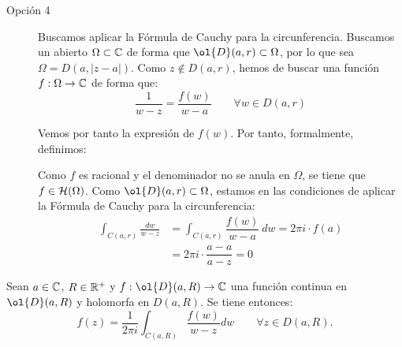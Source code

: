 \begin{ejercicio}
\begin{description}
        \item[Opción 4] Buscamos aplicar la Fórmula de Cauchy para la circunferencia. Buscamos un abierto $\Omega\subset \mathbb{C}$ de forma que $\ol{D}(a,r)\subset \Omega$, por lo que sea $\Omega=D(a,|z-a|)$. Como $z\notin D(a,r)$, hemos de buscar una función $f:\Omega\to \mathbb{C}$ de forma que:
        \begin{equation*}
            \dfrac{1}{w-z} = \dfrac{f(w)}{w-a}\qquad \forall w\in D(a,r)
        \end{equation*}

        Vemos por tanto la expresión de $f(w)$. Por tanto, formalmente, definimos:

        Como $f$ es racional y el denominador no se anula en $\Omega$, se tiene que $f\in \mathcal{H}(\Omega)$. Como $\ol{D}(a,r)\subset \Omega$, estamos en las condiciones de aplicar la Fórmula de Cauchy para la circunferencia:
        \begin{align*}
            \int_{C(a,r)} \frac{dw}{w-z} &= \int_{C(a,r)} \dfrac{f(w)}{w-a}\ dw
            = 2\pi i \cdot f(a)\\
            &= 2\pi i \cdot \dfrac{a-a}{a-z} = 0
        \end{align*}
    \end{description}
\end{ejercicio}

\begin{ejercicio}\label{ej:7.2}
    Sean $a \in \mathbb{C}$, $R \in \mathbb{R}^+$ y $f : \ol{D}(a,R) \to \bb{C}$ una función continua en $\ol{D}(a,R)$ y holomorfa en $D(a,R)$. Se tiene entonces:
    \[
        f(z) = \frac{1}{2\pi i} \int_{C(a,R)} \frac{f(w)}{w-z}dw \qquad \forall z \in D(a,R).
    \]

\end{ejercicio}

